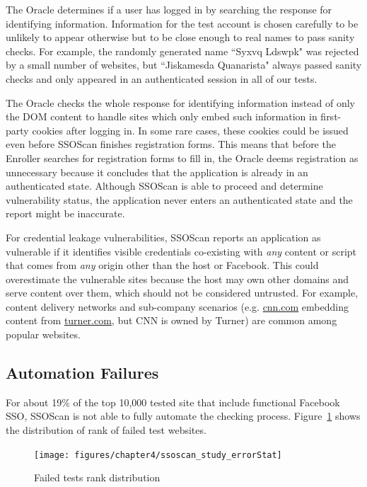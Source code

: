  The Oracle determines if a user has logged in by searching the response for identifying information.  Information for the test account is chosen carefully to be unlikely to appear otherwise but to be close enough to real names to pass sanity checks.  For example, the randomly generated name ``Syxvq Ldswpk" was rejected by a small number of websites,  but ``Jiskamesda Quanarista" always passed sanity checks and only appeared in an authenticated session in all of our tests.

The Oracle checks the whole response for identifying information instead of only the DOM content to handle sites which only embed such information in first-party cookies after logging in.  In some rare cases, these cookies could be issued even before SSOScan finishes registration forms.  This means that before the Enroller searches for registration forms to fill in, the Oracle deems registration as unnecessary because it concludes that the application is already in an authenticated state.  Although SSOScan is able to proceed and determine vulnerability status, the application never enters an authenticated state and the report might be inaccurate.

 For credential leakage vulnerabilities, SSOScan reports an application as vulnerable if it identifies visible credentials co-existing with \emph{any} content or script that comes from \emph{any} origin other than the host or Facebook.  This could overestimate the vulnerable sites because the host may own other domains and serve content over them, which should not be considered untrusted.  For example, content delivery networks and sub-company scenarios (e.g. \url{cnn.com} embedding content from \url{turner.com}, but CNN is owned by Turner) are common among popular websites.

\subsection{Automation Failures}
\label{sec:ssoscan_study_automationFailReasons}

For about 19\% of the top 10,000 tested site that include functional Facebook SSO, SSOScan is not able to fully automate the checking process.  Figure~\ref{fig:ssoscan_study_errorStat} shows the distribution of rank of failed test websites.

\begin{figure}[hbt]
\centering
\texttt{[image: figures/chapter4/ssoscan\_study\_errorStat]}
\caption{Failed tests rank distribution}
\label{fig:ssoscan_study_errorStat}
\end{figure}


